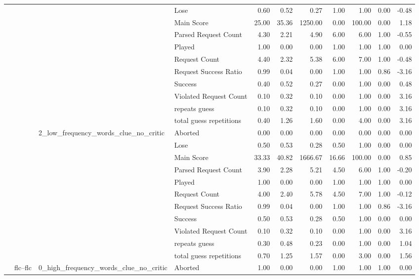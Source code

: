 \begin{tabular}{llllrrrrrrr}
 &  &  & Lose & 0.60 & 0.52 & 0.27 & 1.00 & 1.00 & 0.00 & -0.48 \\
 &  &  & Main Score & 25.00 & 35.36 & 1250.00 & 0.00 & 100.00 & 0.00 & 1.18 \\
 &  &  & Parsed Request Count & 4.30 & 2.21 & 4.90 & 6.00 & 6.00 & 1.00 & -0.55 \\
 &  &  & Played & 1.00 & 0.00 & 0.00 & 1.00 & 1.00 & 1.00 & 0.00 \\
 &  &  & Request Count & 4.40 & 2.32 & 5.38 & 6.00 & 7.00 & 1.00 & -0.48 \\
 &  &  & Request Success Ratio & 0.99 & 0.04 & 0.00 & 1.00 & 1.00 & 0.86 & -3.16 \\
 &  &  & Success & 0.40 & 0.52 & 0.27 & 0.00 & 1.00 & 0.00 & 0.48 \\
 &  &  & Violated Request Count & 0.10 & 0.32 & 0.10 & 0.00 & 1.00 & 0.00 & 3.16 \\
 &  &  & repeats guess & 0.10 & 0.32 & 0.10 & 0.00 & 1.00 & 0.00 & 3.16 \\
 &  &  & total guess repetitions & 0.40 & 1.26 & 1.60 & 0.00 & 4.00 & 0.00 & 3.16 \\
\cline{3-11}
 &  & \multirow[t]{11}{*}{2_low_frequency_words_clue_no_critic} & Aborted & 0.00 & 0.00 & 0.00 & 0.00 & 0.00 & 0.00 & 0.00 \\
 &  &  & Lose & 0.50 & 0.53 & 0.28 & 0.50 & 1.00 & 0.00 & 0.00 \\
 &  &  & Main Score & 33.33 & 40.82 & 1666.67 & 16.66 & 100.00 & 0.00 & 0.85 \\
 &  &  & Parsed Request Count & 3.90 & 2.28 & 5.21 & 4.50 & 6.00 & 1.00 & -0.20 \\
 &  &  & Played & 1.00 & 0.00 & 0.00 & 1.00 & 1.00 & 1.00 & 0.00 \\
 &  &  & Request Count & 4.00 & 2.40 & 5.78 & 4.50 & 7.00 & 1.00 & -0.12 \\
 &  &  & Request Success Ratio & 0.99 & 0.04 & 0.00 & 1.00 & 1.00 & 0.86 & -3.16 \\
 &  &  & Success & 0.50 & 0.53 & 0.28 & 0.50 & 1.00 & 0.00 & 0.00 \\
 &  &  & Violated Request Count & 0.10 & 0.32 & 0.10 & 0.00 & 1.00 & 0.00 & 3.16 \\
 &  &  & repeats guess & 0.30 & 0.48 & 0.23 & 0.00 & 1.00 & 0.00 & 1.04 \\
 &  &  & total guess repetitions & 0.70 & 1.25 & 1.57 & 0.00 & 3.00 & 0.00 & 1.56 \\
\cline{2-11} \cline{3-11}
 & \multirow[t]{33}{*}{flc--flc} & \multirow[t]{11}{*}{0_high_frequency_words_clue_no_critic} & Aborted & 1.00 & 0.00 & 0.00 & 1.00 & 1.00 & 1.00 & 0.00 \\

\end{tabular}
